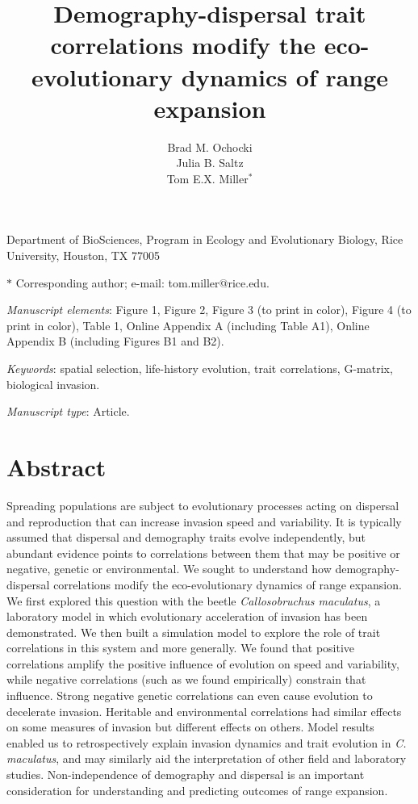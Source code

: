 \documentclass[11pt]{article}
\title{Demography-dispersal trait correlations modify the eco-evolutionary dynamics of range expansion}
\author{Brad M. Ochocki \\
Julia B. Saltz \\
Tom E.X. Miller$^{\ast}$}
\date{}
\begin{document}
\maketitle

\noindent{} Department of BioSciences, Program in Ecology and Evolutionary Biology, Rice University, Houston, TX 77005

\noindent{} $\ast$ Corresponding author; e-mail: tom.miller@rice.edu.

\bigskip

\textit{Manuscript elements}: Figure 1, Figure 2, Figure 3 (to print in color), Figure 4 (to print in color), Table 1, Online Appendix A (including Table A1), Online Appendix B (including Figures B1 and B2).

\bigskip

\textit{Keywords}: spatial selection, life-history evolution, trait correlations, G-matrix, biological invasion.

\bigskip

\textit{Manuscript type}: Article.

\bigskip


\linenumbers{}
\modulolinenumbers[3]

\newpage{}

\section*{Abstract}
Spreading populations are subject to evolutionary processes acting on dispersal and reproduction that can increase invasion speed and variability. It is typically assumed that dispersal and demography traits evolve independently, but abundant evidence points to correlations between them that may be positive or negative, genetic or environmental. We sought to understand how demography-dispersal correlations modify the eco-evolutionary dynamics of range expansion. We first explored this question with the beetle \textit{Callosobruchus maculatus}, a laboratory model in which evolutionary acceleration of invasion has been demonstrated. We then built a simulation model to explore the role of trait correlations in this system and more generally. We found that positive correlations amplify the positive influence of evolution on speed and variability, while negative correlations (such as we found empirically) constrain that influence. Strong negative genetic correlations can even cause evolution to decelerate invasion. Heritable and environmental correlations had similar effects on some measures of invasion but different effects on others. Model results enabled us to retrospectively explain invasion dynamics and trait evolution in \textit{C. maculatus}, and may similarly aid the interpretation of other field and laboratory studies. Non-independence of demography and dispersal is an important consideration for understanding and predicting outcomes of range expansion.
\end{document}
